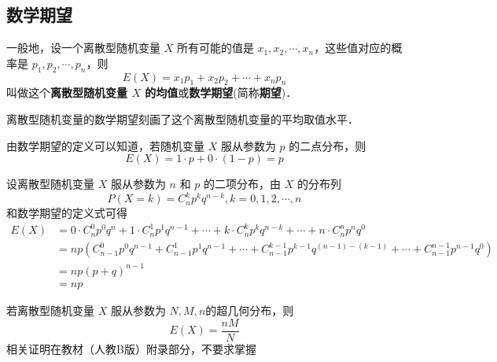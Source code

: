 
\begin{issues}
\issueDraft
\end{issues}

\subsection{数学期望}
一般地，设一个离散型随机变量 $X$ 所有可能的值是 $x_1,x_2,\cdots,x_n$，这些值对应的概率是 $p_1,p_2,\cdots,p_n$，则
\begin{equation}
E(X) = x_1p_1 + x_2p_2 + \cdots + x_np_n
\end{equation}
叫做这个\textbf{离散型随机变量 $X$ 的均值}或\textbf{数学期望}(简称\textbf{期望})．

离散型随机变量的数学期望刻画了这个离散型随机变量的平均取值水平．

由数学期望的定义可以知道，若随机变量 $X$ 服从参数为 $p$ 的二点分布，则
\begin{equation}
E(X) = 1 \cdot p + 0 \cdot(1 - p) = p
\end{equation}

设离散型随机变量 $X$ 服从参数为 $n$ 和 $p$ 的二项分布，由 $X$ 的分布列
\begin{equation}
P(X = k) = C_n^kp^kq^{n-k},k=0,1,2,\cdots ,n
\end{equation}
和数学期望的定义式可得
\begin{equation}
\begin{aligned}
E(X) &= 0\cdot C_n^0p^0q^n+1\cdot C_n^1p^1q^{n-1}+\cdots +k\cdot C_n^kp^kq^{n-k}+\cdots +n\cdot C_n^np^nq^0 \\
&= np(C_{n-1}^0p^0q^{n-1}+C_{n-1}^1p^1q^{n-1}+\cdots +C_{n-1}^{k-1}p^{k-1}q^{(n-1)-(k-1)}+\cdots+C_{n-1}^{n-1}p^{n-1}q^0) \\
&= np(p+q)^{n-1} \\
&= np
\end{aligned}
\end{equation}

若离散型随机变量 $X$ 服从参数为 $N,M,n$的超几何分布，则
\begin{equation}
E(X) = \frac{nM}{N}
\end{equation}
相关证明在教材（人教B版）附录部分，不要求掌握